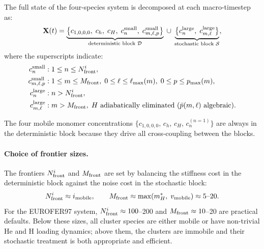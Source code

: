 \documentclass[pdflatex,sn-basic]{sn-jnl} %
\begin{document}
The full state of the four-species system is decomposed at each
macro-timestep as:
\begin{equation}\label{eq:hybrid_state}
    \mathbf{X}(t)
    = \underbrace{
      \bigl\{
        c_{1,0,0,0},\;
        c_h,\;
        c_H,\;
        c_n^{\rm small},\;
        c_{m,\ell,p}^{\rm small}
      \bigr\}
      }_{\text{deterministic block }\mathcal{D}}
    \;\cup\;
    \underbrace{
      \bigl\{
        c_n^{\rm large},\;
        c_{m,\ell}^{\rm large}
      \bigr\}
      }_{\text{stochastic block }\mathcal{S}},
\end{equation}
where the superscripts indicate:
\begin{align}
    c_n^{\rm small} &: 1 \leq n \leq N_{\rm front}^i, \label{eq:Dsmall}\\
    c_{m,\ell,p}^{\rm small} &: 1 \leq m \leq M_{\rm front},\;
      0 \leq \ell \leq \ell_{\max}(m),\;
      0 \leq p \leq p_{\max}(m), \label{eq:Dsmall_vac}\\
    c_n^{\rm large} &: n > N_{\rm front}^i, \label{eq:Slarge_SIA}\\
    c_{m,\ell}^{\rm large} &: m > M_{\rm front},\;
      H\text{ adiabatically eliminated }(\bar{p}(m,\ell)\text{ algebraic}).
      \label{eq:Slarge_vac}
\end{align}

The four mobile monomer concentrations
$\{c_{1,0,0,0},\,c_h,\,c_H,\,c_n^{(n=1)}\}$ are always in the
deterministic block because they drive all cross-coupling between the
blocks.

\paragraph{Choice of frontier sizes.}
The frontiers $N_{\rm front}^i$ and $M_{\rm front}$ are set by
balancing the stiffness cost in the deterministic block against the
noise cost in the stochastic block:
\begin{equation}\label{eq:frontier_choice}
    N_{\rm front}^i \approx i_{\rm mobile},
    \qquad
    M_{\rm front} \approx \max(m_H^*,\;v_{\rm mobile}) \approx 5\text{--}20.
\end{equation}
For the EUROFER97 system, $N_{\rm front}^i \approx 100$--200 and
$M_{\rm front} \approx 10$--20 are practical defaults.  Below these
sizes, all cluster species are either mobile or have non-trivial He
and H loading dynamics; above them, the clusters are immobile and
their stochastic treatment is both appropriate and efficient.

\end{document}
